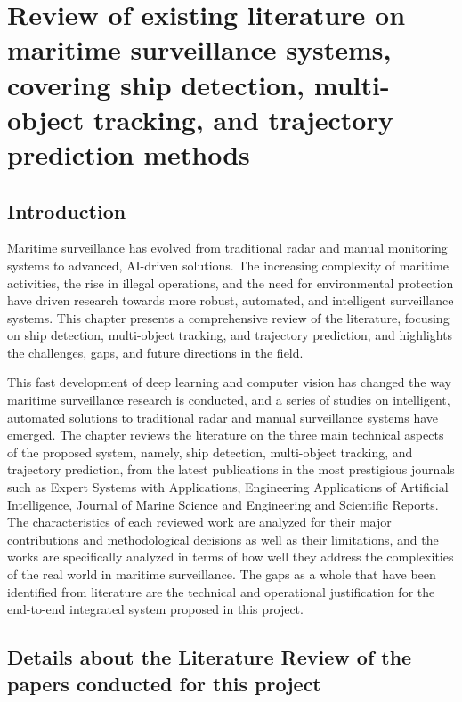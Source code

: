 \chapter{Review of existing literature on maritime surveillance systems, covering ship detection, multi-object tracking, and trajectory prediction methods}

\section{Introduction}
Maritime surveillance has evolved from traditional radar and manual monitoring systems to advanced, AI-driven solutions. The increasing complexity of maritime activities, the rise in illegal operations, and the need for environmental protection have driven research towards more robust, automated, and intelligent surveillance systems. This chapter presents a comprehensive review of the literature, focusing on ship detection, multi-object tracking, and trajectory prediction, and highlights the challenges, gaps, and future directions in the field.


This fast development of deep learning and computer vision has changed the way maritime surveillance research is conducted, and a series of studies on intelligent, automated solutions to traditional radar and manual surveillance systems have emerged. The chapter reviews the literature on the three main technical aspects of the proposed system, namely, ship detection, multi-object tracking, and trajectory prediction, from the latest publications in the most prestigious journals such as Expert Systems with Applications, Engineering Applications of Artificial Intelligence, Journal of Marine Science and Engineering and Scientific Reports. The characteristics of each reviewed work are analyzed for their major contributions and methodological decisions as well as their limitations, and the works are specifically analyzed in terms of how well they address the complexities of the real world in maritime surveillance. The gaps as a whole that have been identified from literature are the technical and operational justification for the end-to-end integrated system proposed in this project.

\section{Details about the Literature Review of the papers conducted for this project}

